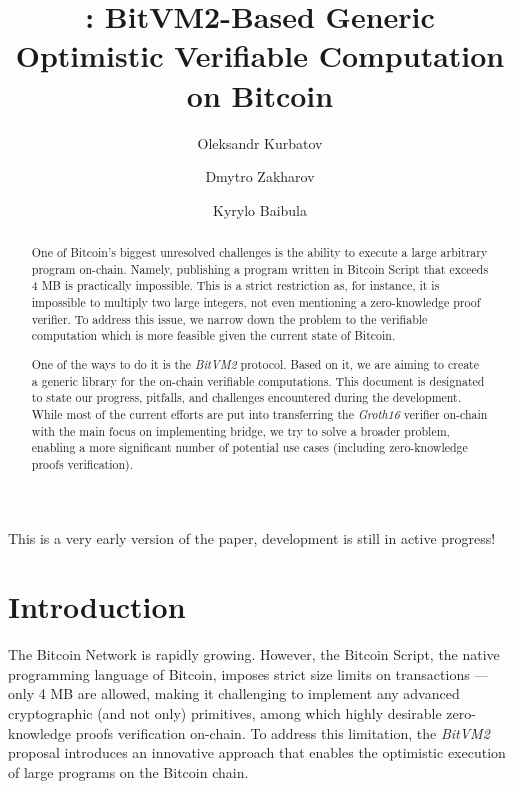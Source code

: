 \documentclass{iacrtrans}
\author{Oleksandr Kurbatov\inst{1} \and Dmytro Zakharov\inst{1}
\and Kyrylo Baibula \inst{1}}
\institute{Distributed Lab
  \email{ok@distributedlab.com},
  \email{dmytro.zakharov@distributedlab.com},
\email{kyrylo.baybula@distributedlab.com}}
\title[Verifiable Computation on
Bitcoin]{\nero: BitVM2-Based Generic
Optimistic Verifiable Computation on Bitcoin}
\begin{document}
\maketitle


\begin{abstract}
  One of Bitcoin's biggest unresolved challenges is the ability to execute a
  large arbitrary program on-chain. Namely, publishing a program written in
  Bitcoin Script that exceeds 4 MB is practically impossible. This is a strict
  restriction as, for instance, it is impossible to multiply two large integers,
  not even mentioning a zero-knowledge proof verifier. To address this issue, we
  narrow down the problem to the verifiable computation which is more feasible
  given the current state of Bitcoin.

  One of the ways to do it is the \textit{BitVM2} protocol. Based on
  it, we are aiming to
  create a generic library for the on-chain verifiable computations. This
  document is designated to state our progress, pitfalls, and challenges
  encountered during the development. While most of the current
  efforts are put into
  transferring the \textit{Groth16} verifier on-chain with the
  main focus on implementing bridge, we try to solve
  a broader problem, enabling a more significant number of potential use cases
  (including zero-knowledge proofs verification).
\end{abstract}

\setcounter{tocdepth}{2}
\tableofcontents

\begin{tcolorbox}[colback=green!15!white, halign title=flush center,
  colframe=green!70!black, fonttitle=\bfseries\large, title=Note, sharp corners]
  \centering This is a very early version of the paper, development is still in
  active progress!
\end{tcolorbox}

\section{Introduction}\label{sec:intro}

The Bitcoin Network \autocite{bitcoin_paper} is rapidly growing. However, the
Bitcoin Script, the native programming language of Bitcoin, imposes strict size
limits on transactions --- only 4 MB are allowed, making it challenging to
implement any advanced cryptographic (and not only) primitives, among which
highly desirable zero-knowledge proofs verification on-chain. To address this
limitation, the \textit{BitVM2} \autocite{bitvm2} proposal introduces
an innovative
approach that enables the optimistic execution of large programs on the Bitcoin
chain.
\end{document}
